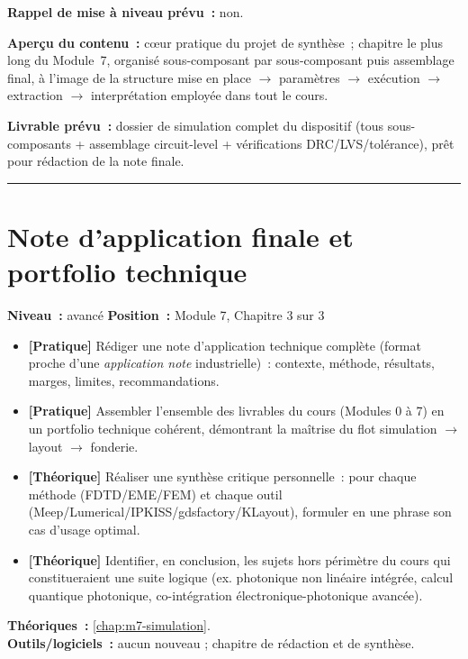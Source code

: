 \noindent\textbf{Rappel de mise à niveau prévu~:} non.

\noindent\textbf{Aperçu du contenu~:} cœur pratique du projet de synthèse~; chapitre le plus long du Module~7, organisé sous-composant par sous-composant puis assemblage final, à l'image de la structure \og mise en place $\to$ paramètres $\to$ exécution $\to$ extraction $\to$ interprétation\fg{} employée dans tout le cours.

\noindent\textbf{Livrable prévu~:} dossier de simulation complet du dispositif (tous sous-composants + assemblage circuit-level + vérifications DRC/LVS/tolérance), prêt pour rédaction de la note finale.

\bigskip\hrule\bigskip

\chapter{Note d'application finale et portfolio technique}
\label{chap:m7-note-finale}

\noindent\textbf{Niveau~:} avancé \hfill \textbf{Position~:} Module 7, Chapitre 3 sur 3

\begin{objectifs}
\begin{itemize}[leftmargin=1.4em]
  \item \textbf{[Pratique]} Rédiger une note d'application technique complète (format proche d'une \emph{application note} industrielle)~: contexte, méthode, résultats, marges, limites, recommandations.
  \item \textbf{[Pratique]} Assembler l'ensemble des livrables du cours (Modules 0 à 7) en un portfolio technique cohérent, démontrant la maîtrise du flot simulation $\to$ layout $\to$ fonderie.
  \item \textbf{[Théorique]} Réaliser une synthèse critique personnelle~: pour chaque méthode (FDTD/EME/FEM) et chaque outil (Meep/Lumerical/IPKISS/gdsfactory/KLayout), formuler en une phrase son cas d'usage optimal.
  \item \textbf{[Théorique]} Identifier, en conclusion, les sujets hors périmètre du cours qui constitueraient une suite logique (ex. photonique non linéaire intégrée, calcul quantique photonique, co-intégration électronique-photonique avancée).
\end{itemize}
\end{objectifs}

\begin{prerequis}
\textbf{Théoriques~:} \cref{chap:m7-simulation}.\\
\textbf{Outils/logiciels~:} aucun nouveau ; chapitre de rédaction et de synthèse.
\end{prerequis}

